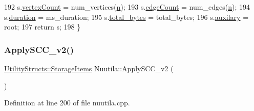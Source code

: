 \begin{DoxyCode}
192     s.\hyperlink{struct_utility_structs_1_1_storage_items_af72522be713f23fcfe3ac66780183fda}{vertexCount} = num\_vertices(\hyperlink{class_nuutila_a1409929fa0f38709497f8bdb012af71c}{n});
193     s.\hyperlink{struct_utility_structs_1_1_storage_items_afafcba9bb103108e2c1e1d9254fb75c5}{edgeCount} = num\_edges(\hyperlink{class_nuutila_a1409929fa0f38709497f8bdb012af71c}{n});
194     s.\hyperlink{struct_utility_structs_1_1_storage_items_a65e7df5611a4e144cc27576bd3041f6c}{duration} = ms\_duration;
195     s.\hyperlink{struct_utility_structs_1_1_storage_items_a39cf482db54d8e6ac473b438444c8a1e}{total\_bytes} = total\_bytes;
196     s.\hyperlink{struct_utility_structs_1_1_storage_items_afb9d346eaacb1c5e7f60f559c45910f2}{auxilary} = root;
197     \textcolor{keywordflow}{return} s;
198 \}
\end{DoxyCode}
\mbox{\label{class_nuutila_a291d578f760e0f11a5c56c8a5fe02ebd}} 
\subsubsection{\texorpdfstring{Apply\+S\+C\+C\+\_\+v2()}{ApplySCC\_v2()}}
{\footnotesize\ttfamily \hyperlink{struct_utility_structs_1_1_storage_items}{Utility\+Structs\+::\+Storage\+Items} Nuutila\+::\+Apply\+S\+C\+C\+\_\+v2 (\begin{DoxyParamCaption}{ }\end{DoxyParamCaption})}



Definition at line 200 of file nuutila.\+cpp.


